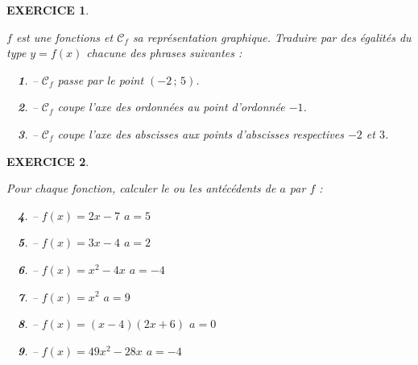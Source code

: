 \documentclass[a4paper]{article}   %
\renewcommand{\(}{\left(}
\renewcommand{\)}{\right)}
\newtheorem{ques}{~}
\newenvironment{qu}{\begin{ques}--} {\end{ques}}
\newtheorem{EXO}{\large EXERCICE }
\newenvironment{EX}   { \setcounter{ques}{0} \begin{EXO} \hrulefill ~\vspace{0.3cm}

\normalfont}    {\end{EXO} \medskip}
\begin{document}
\begin{EX}
$f$ est une fonctions et $\mathcal{C}_f$ sa représentation graphique. Traduire par des égalités du type $y=f(x)$ chacune des phrases suivantes :
\begin{qu} $\mathcal{C}_f$ passe par le point $(-2\,;\,5)$.
\end{qu}
\begin{qu} $\mathcal{C}_f$ coupe l'axe des ordonnées au point d'ordonnée $-1$.
\end{qu}
\begin{qu} $\mathcal{C}_f$ coupe l'axe des abscisses aux points d'abscisses respectives $-2$ et $3$.
\end{qu}
\end{EX}

\begin{EX}
Pour chaque fonction, calculer le ou les antécédents de $a$ par $f$ :
\begin{qu} $f(x)=2x-7$ \qquad $a=5$
\end{qu}
\begin{qu} $f(x)=3x-4$ \qquad $a=2$
\end{qu}
\begin{qu} $f(x)=x^2-4x$ \qquad $a=-4$
\end{qu}
\begin{qu} $f(x)=x^2$ \qquad $a=9$
\end{qu}
\begin{qu} $f(x)=(x-4)(2x+6)$ \qquad $a=0$
\end{qu}
\begin{qu} $f(x)=49x^2-28x$ \qquad $a=-4$
\end{qu}

\end{EX}
\end{document}
